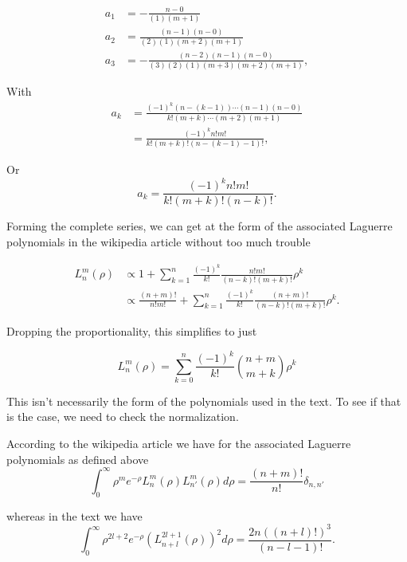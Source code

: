 \begin{align*}
a_1 &= -\frac{n-0}{(1)(m+1)} \\
a_2 &= \frac{(n-1)(n-0)}{(2)(1)(m+2)(m+1)} \\
a_3 &= -\frac{(n-2)(n-1)(n-0)}{(3)(2)(1)(m+3)(m+2)(m+1)},
\end{align*}

With
\begin{align*}
a_k 
&= \frac{(-1)^k (n-(k-1))\cdots(n-1)(n-0)}{k!(m+k)\cdots(m+2)(m+1)} \\
&= \frac{(-1)^k n! m!}{k!(m+k)!(n-(k-1) -1)!},
\end{align*}

Or
\begin{equation}\label{eqn:hyrdogenLaguerre:130}
a_k 
= \frac{(-1)^k n! m!}{k!(m+k)!(n-k)!}.
\end{equation}

Forming the complete series, we can get at the form of the associated Laguerre polynomials in the wikipedia article without too much trouble

\begin{align*}
L_n^m(\rho) 
&\propto 1 + \sum_{k=1}^n \frac{(-1)^k}{k!} \frac{n! m!}{(n-k)!(m+k)!} \rho^k \\
&\propto \frac{(n+m)!}{n!m!} + \sum_{k=1}^n \frac{(-1)^k}{k!} \frac{(n+m)!}{(n-k)!(m+k)!} \rho^k.
\end{align*}

Dropping the proportionality, this simplifies to just

\begin{equation}\label{eqn:hyrdogenLaguerre:140}
L_n^m(\rho) = \sum_{k=0}^n \frac{(-1)^k}{k!} \binom{n+m}{m+k} \rho^k
\end{equation}

This isn't necessarily the form of the polynomials used in the text.  To see if that is the case, we need to check the normalization.

According to the wikipedia article we have for the associated Laguerre polynomials as defined above
\begin{equation}\label{eqn:hyrdogenLaguerre:150}
\int_0^{\infty}\rho^m e^{-\rho} L_n^{m}(\rho)L_{n'}^{m}(\rho)d\rho = \frac{(n+m)!}{n!}\delta_{n,{n'}}
\end{equation}

whereas in the text we have
\begin{equation}\label{eqn:hyrdogenLaguerre:150b}
\int_0^{\infty}\rho^{2l + 2} e^{-\rho} \left( L_{n+l}^{2l + 1}(\rho) \right)^2 d\rho = \frac{2n ((n+l)!)^3}{(n-l-1)!}.
\end{equation}

